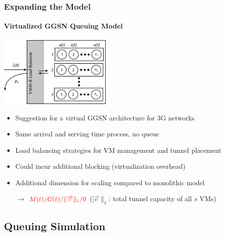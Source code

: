 \documentclass{beamer}
\begin{document}
\begin{frame}
	\frametitle{Expanding the Model}
	\framesubtitle{Virtualized GGSN Queuing Model}
		\begin{center}
			\includegraphics[height=3.5cm]{extras/ggsn-virtualized.png}
		\end{center}

		\begin{itemize}
			\item Suggestion for a virtual GGSN architecture for 3G networks
			\item Same arrival and serving time process, no queue
			\item Load balancing strategies for VM management and tunnel placement
			\item Could incur additional blocking (virtualization overhead)
			\item Additional dimension for scaling compared to monolithic model
			\item[$\rightarrow$] $\color{red}M(t)/G(t)/\|\overrightarrow{c}\|_1/0$ ($|\overrightarrow{c}\|_1$: total tunnel capacity of all $s$ VMs) %
		\end{itemize}
\end{frame}


\subsection{Queuing Simulation}
\end{document}
